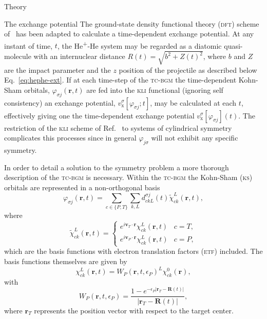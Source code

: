\documentclass[aps, pra, reprint, groupedaddress, amsfonts, longbibliography,
               amsmath, amssymb, showpacs, nofootinbib]{revtex4-1}
\begin{document}
\begin{section}{Theory \label{sec:theory}}
\begin{subsection}{The exchange potential \label{sec:xpot}}
      The ground-state density functional theory (\textsc{dft}) scheme of~\cite{diamol} has been adapted
      to calculate a time-dependent exchange potential. At any instant of time, $t$, the
      He\textsuperscript{+}-He system may be regarded as a diatomic quasi-molecule with an internuclear
      distance $R(t) = \sqrt{b^2 + Z(t)^2}$, where $b$ and $Z$ are the impact parameter and the $z$
      position of the projectile as described below Eq.~\eqref{eq:hephe-ext}. If at each
      time-step of the \textsc{tc-bgm} the time-dependent Kohn-Sham orbitals,
      $\varphi_{\sigma j}(\mathbf{r},t)$ are fed into the \textsc{kli} functional (ignoring self
      consistency) an exchange potential, $v^{\sigma}_\mathrm{x}[\varphi_{\sigma j};t]$, may be
      calculated at each $t$, effectively giving one the time-dependent exchange potential
      $v^{\sigma}_\mathrm{x}[\varphi_{\sigma j}](t)$. The restriction of the \textsc{kli} scheme of
      Ref.~\cite{diamol} to systems of cylindrical symmetry complicates this processes since in general
      $\varphi_{j \sigma}$ will not exhibit any specific symmetry.
      
      In order to detail a solution to the symmetry problem a more thorough description of the
      \textsc{tc-bgm} is necessary. Within the \textsc{tc-bgm} the Kohn-Sham (\textsc{ks}) orbitals are
      represented in a non-orthogonal basis
      \begin{equation} \label{eq:bgmexp}
         \varphi_{\sigma j}(\mathbf{r},t) = \sum\limits_{c \in \{P, T\}} \sum\limits_{k, L}
                               d_{c k L}^{\sigma j}(t) \tilde{\chi}^{L}_{c k}(\mathbf{r},t),
      \end{equation}
      where
      \begin{equation} \label{eq:etfbasis}
         \tilde{\chi}^{L}_{ck}(\mathbf{r},t) =
            \begin{cases}
               e^{i \mathbf{v}_T \cdot \mathbf{r}} {\chi}^{L}_{c k}(\mathbf{r},t) & c = T, \\[2ex]
               e^{i \mathbf{v}_P \cdot \mathbf{r}} {\chi}^{L}_{c k}(\mathbf{r},t) & c = P,
            \end{cases}
      \end{equation}
      which are the basis functions with electron translation factors (\textsc{etf}) included. The basis
      functions themselves are given by
      \begin{equation} \label{eq:bgmbasis}
         \chi^{L}_{ck} (\mathbf{r},t)
         = W_P( \mathbf{r},t, \epsilon_P)^L \chi^{0}_{ck} (\mathbf{r}),
      \end{equation}
      with
      \begin{equation}
         W_P (\mathbf{r},t,\epsilon_P)
         = \frac{1 - e^{-\epsilon_P|\mathbf{r}_T - \mathbf{R}(t)|}}{|\mathbf{r}_T - \mathbf{R}(t)|},
      \end{equation}
      where $\mathbf{r}_T$ represents the position vector with respect to the target center.
      

\end{subsection}
\end{section}
\end{document}
